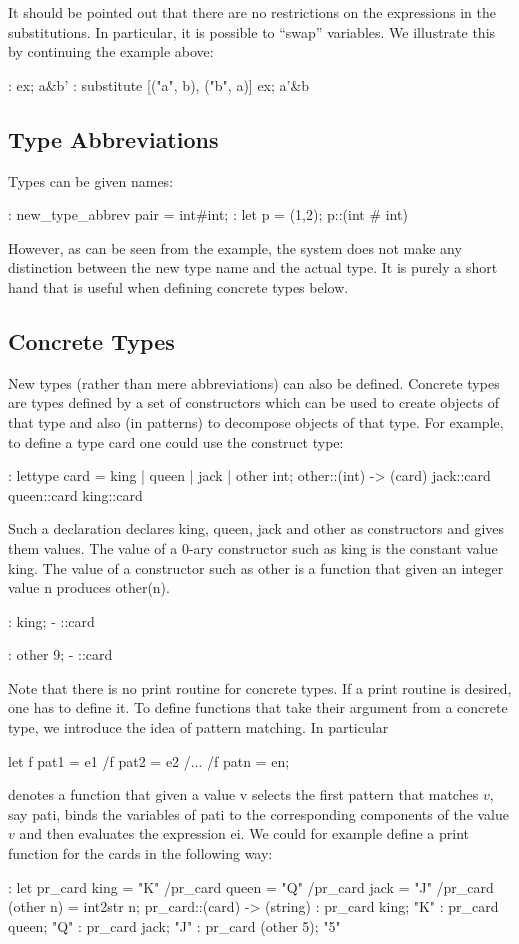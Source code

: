 It should be pointed out that there are no restrictions on the expressions
in the substitutions.
In particular, it is possible to ``swap'' variables. We illustrate this by continuing the example above:
\begin{hol}
: ex;
a&b'
: substitute [("a", b), ("b", a)] ex;
a'&b
\end{hol}

\subsection{Type Abbreviations}

Types can be given names:
\begin{hol}
: new_type_abbrev pair = int#int;
: let p = (1,2);
p::(int # int)
\end{hol}
However, as can be seen from the example, the system does not
make any distinction between the new type name
and the actual type. It is purely a short hand that is useful when
defining concrete types below.

\subsection{Concrete Types}

New types (rather than mere abbreviations) can also be defined. Concrete
types are types
defined by a set of constructors which can be used to create objects
of that type and also (in
patterns) to decompose objects of that type. For example, to define
a type card one could use the
construct type:
\begin{hol}
: lettype card = king | queen | jack | other int;
other::(int) -> (card)
jack::card
queen::card
king::card
\end{hol}
Such a declaration declares king, queen, jack and other as constructors
and gives them
values. The value of a 0-ary constructor such as king is the constant
value king. The value of a
constructor such as other is a function that given an integer value
n produces other(n).
\begin{hol}
: king;
- ::card

: other 9;
- ::card
\end{hol}

Note that there is no print routine for concrete types. If a print
routine is desired, one has to
define it.
To define functions that take their argument from a concrete type,
we introduce the idea of pattern matching.
In particular
\begin{hol}
let f pat1 = e1
 /\verb@\@ f pat2 = e2
 /\verb@\@ ...
 /\verb@\@ f patn = en;
\end{hol}
denotes a function that given a value v selects the first pattern that
matches $v$, say pati, binds the variables of pati to
the corresponding components of the value $v$ and then evaluates the
expression ei.
We could for example define a print function for the cards in the following way:
\begin{hol}
: let pr_card king = "K"
  /\verb@\@  pr_card queen = "Q"
  /\verb@\@  pr_card jack = "J"
  /\verb@\@  pr_card (other n) = int2str n;
pr_card::(card) -> (string)
: pr_card king;
"K"
: pr_card queen;
"Q"
: pr_card jack;
"J"
: pr_card (other 5);
"5"
\end{hol}

